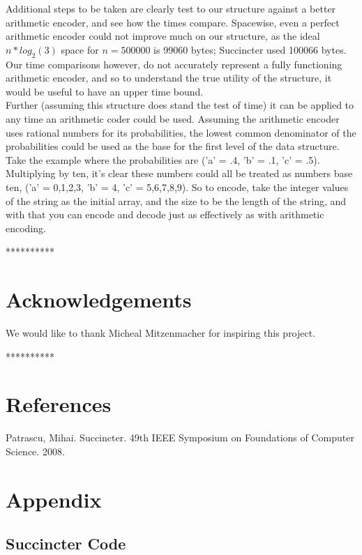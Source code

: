 \documentclass{article}
\begin{document}
Additional steps to be taken are clearly test to our structure against a better arithmetic encoder, and see how the times compare. Spacewise, even a perfect arithmetic encoder could not improve much on our structure, as the ideal $n*log_2(3)$ space for $n = 500000$ is 99060 bytes; Succincter used 100066 bytes. Our time comparisons however, do not accurately represent a fully functioning arithmetic encoder, and so to understand the true utility of the structure, it would be useful to have an upper time bound.\\

Further (assuming this structure does stand the test of time) it can be applied to any time an arithmetic coder could be used. Assuming the arithmetic encoder uses rational numbers for its probabilities, the lowest common denominator of the probabilities could be used as the base for the first level of the data structure. Take the example where the probabilities are ('a' = .4,  'b' = .1, 'c' = .5). Multiplying by ten, it's clear these numbers could all be treated as numbers base ten, ('a' = 0,1,2,3, 'b' = 4, 'c' = 5,6,7,8,9). So to encode, take the integer values of the string as the initial array, and the size to be the length of the string, and with that you can encode and decode just as effectively as with arithmetic encoding.\\

\bigskip
\centerline{**********}
\noindent \section{Acknowledgements}
	We would like to thank Micheal Mitzenmacher for inspiring this project.

\bigskip
\centerline{**********}

\noindent \section{References}
Patrascu, Mihai. Succincter. 49th IEEE Symposium on Foundations of Computer Science. 2008.

\noindent \section{Appendix}
\noindent \subsection{Succincter Code}


\end{document}
